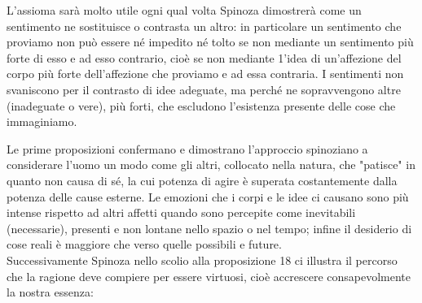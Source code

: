 L'assioma sarà molto utile ogni qual volta Spinoza dimostrerà come  un sentimento ne sostituisce o contrasta un altro: in particolare un sentimento che proviamo non può essere né impedito né tolto se
non mediante un sentimento più forte di esso e ad esso contrario, cioè se non mediante 1’idea di un’affezione del corpo più forte dell’affezione che proviamo e ad essa contraria. I sentimenti non svaniscono per il contrasto di idee adeguate, ma perché ne sopravvengono altre (inadeguate o vere), più forti, che escludono l’esistenza presente delle cose che immaginiamo.

Le prime proposizioni confermano e dimostrano l'approccio spinoziano a considerare l'uomo un modo come gli altri, collocato nella natura, che "patisce" in quanto non causa di sé, la cui potenza di agire è superata costantemente dalla potenza delle cause esterne. Le emozioni che i corpi e le idee ci causano sono più intense rispetto ad altri affetti quando sono percepite come inevitabili (necessarie), presenti e non lontane nello spazio o nel tempo; infine il desiderio di cose reali è maggiore che  verso quelle possibili e future.\\
Successivamente Spinoza nello scolio alla proposizione 18 ci illustra il percorso che la ragione deve compiere per essere virtuosi, cioè accrescere consapevolmente la nostra essenza:

